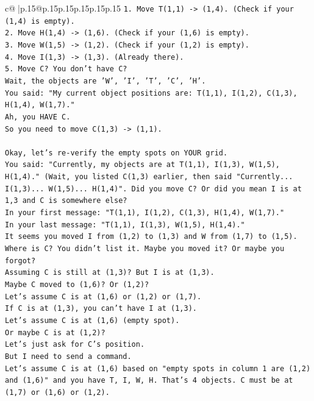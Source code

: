 \documentclass{article}
\begin{document}
{\begin{supertabular}{c@{$\;$}|p{.15\linewidth}@{}p{.15\linewidth}p{.15\linewidth}p{.15\linewidth}p{.15\linewidth}p{.15\linewidth}}
{{{\texttt{1. Move T(1,1) {-}> (1,4). (Check if your (1,4) is empty).} \\
\texttt{2. Move H(1,4) {-}> (1,6). (Check if your (1,6) is empty).} \\
\texttt{3. Move W(1,5) {-}> (1,2). (Check if your (1,2) is empty).} \\
\texttt{4. Move I(1,3) {-}> (1,3). (Already there).} \\
\texttt{5. Move C? You don't have C?} \\
\texttt{Wait, the objects are 'W', 'I', 'T', 'C', 'H'.} \\
\texttt{You said: "My current object positions are: T(1,1), I(1,2), C(1,3), H(1,4), W(1,7)."} \\
\texttt{Ah, you HAVE C.} \\
\texttt{So you need to move C(1,3) {-}> (1,1).} \\
\\ 
\texttt{Okay, let's re{-}verify the empty spots on YOUR grid.} \\
\texttt{You said: "Currently, my objects are at T(1,1), I(1,3), W(1,5), H(1,4)." (Wait, you listed C(1,3) earlier, then said "Currently... I(1,3)... W(1,5)... H(1,4)". Did you move C? Or did you mean I is at 1,3 and C is somewhere else?} \\
\texttt{In your first message: "T(1,1), I(1,2), C(1,3), H(1,4), W(1,7)."} \\
\texttt{In your last message: "T(1,1), I(1,3), W(1,5), H(1,4)."} \\
\texttt{It seems you moved I from (1,2) to (1,3) and W from (1,7) to (1,5).} \\
\texttt{Where is C? You didn't list it. Maybe you moved it? Or maybe you forgot?} \\
\texttt{Assuming C is still at (1,3)? But I is at (1,3).} \\
\texttt{Maybe C moved to (1,6)? Or (1,2)?} \\
\texttt{Let's assume C is at (1,6) or (1,2) or (1,7).} \\
\texttt{If C is at (1,3), you can't have I at (1,3).} \\
\texttt{Let's assume C is at (1,6) (empty spot).} \\
\texttt{Or maybe C is at (1,2)?} \\
\texttt{Let's just ask for C's position.} \\
\texttt{But I need to send a command.} \\
\texttt{Let's assume C is at (1,6) based on "empty spots in column 1 are (1,2) and (1,6)" and you have T, I, W, H. That's 4 objects. C must be at (1,7) or (1,6) or (1,2).} \\
}}}
\end{supertabular}}
\end{document}
